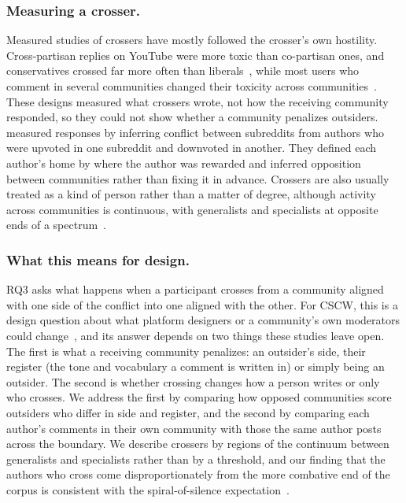 \subsubsection{Measuring a crosser.}
Measured studies of crossers have mostly followed the crosser's own hostility. Cross-partisan replies on YouTube were more toxic than co-partisan ones, and conservatives crossed far more often than liberals~\cite{wu2021crosspartisan}, while most users who comment in several communities changed their toxicity across communities~\cite {almerekhi2022toxicity}. These designs measured what crossers wrote, not how the receiving community responded, so they could not show whether a community penalizes outsiders. \citet{datta2019interconflict} measured responses by inferring conflict between subreddits from authors who were upvoted in one subreddit and downvoted in another. They defined each author's home by where the author was rewarded and inferred opposition between communities rather than fixing it in advance. Crossers are also usually treated as a kind of person rather than a matter of degree, although activity across communities is continuous, with generalists and specialists at opposite ends of a spectrum~\cite{waller2019generalists}. 

\subsubsection{What this means for design.}
RQ3 asks what happens when a participant crosses from a community aligned with one side of the conflict into one aligned with the other. For CSCW, this is a design question about what platform designers or a community's own moderators could change~\cite{rajadesingan2021crosspartisan}, and its answer depends on two things these studies leave open. The first is what a receiving community penalizes: an outsider's side, their register (the tone and vocabulary a comment is written in) or simply being an outsider. The second is whether crossing changes how a person writes or only who crosses. We address the first by comparing how opposed communities score outsiders who differ in side and register, and the second by comparing each author's comments in their own community with those the same author posts across the boundary. We describe crossers by regions of the continuum between generalists and specialists rather than by a threshold, and our finding that the authors who cross come disproportionately from the more combative end of the corpus is consistent with the spiral-of-silence expectation~\cite{noelleneumann1974spiral}. 

